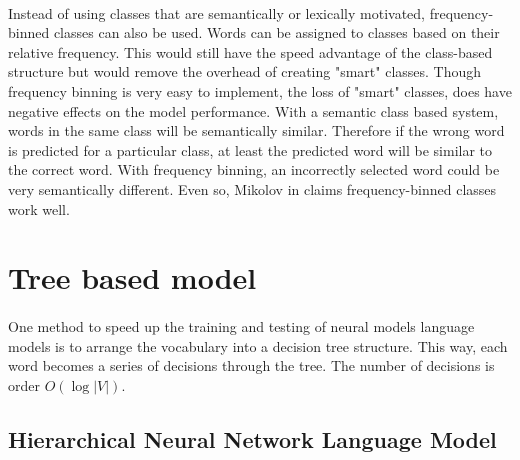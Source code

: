 \paragraph{}
Instead of using classes that are semantically or lexically motivated, frequency-binned classes can also be used. Words can be assigned to classes based on their relative frequency. This would still have the speed advantage of the class-based structure but would remove the overhead of creating "smart" classes. Though frequency binning is very easy to implement, the loss of "smart" classes, does have negative effects on the model performance. With a semantic class based system, words in the same class will be semantically similar. Therefore if the wrong word is predicted for a particular class, at least the predicted word will be similar to the correct word. With frequency binning, an incorrectly selected word could be very semantically different. Even so, Mikolov in \cite{Mikolov2012} claims frequency-binned classes work well. 

\section{Tree based model}
\paragraph{}
One method to speed up the training and testing of neural models language models is to arrange the vocabulary into a decision tree structure. This way, each word becomes a series of decisions through the tree. The number of decisions is order $O(\log|V|)$.

\subsection{Hierarchical Neural Network Language Model}
